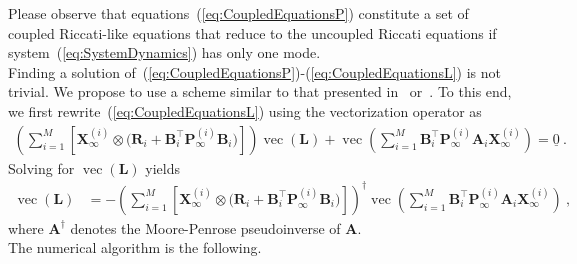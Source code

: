 \documentclass[preprint,1p,11pt]{IR-Template/ISAS_IR}
\newcommand{\nvec}[1]{\ensuremath{{{\underline{#1}}}}}
\newcommand{\mat}[1]{{\ensuremath{{\mathbf{#1}}}}}
\newcommand{\pinv}{^\dagger}
\newcommand{\tr}{^{\top}}
\DeclareMathOperator{\vvec}{vec}
\renewcommand{\vec}[1]{\vvec\klammer{#1}}
\newcommand{\klammer}[1]{\left( #1 \right)}
\newcommand{\bklammer}[1]{\left[ #1 \right]}
\newcommand{\kron}[2]{{#1 \otimes #2}}
\newcommand{\Asys}[1]{\mat{A}_{#1}}
\newcommand{\Bsys}[1]{\mat{B}_{#1}}
\newcommand{\Rsys}[1]{\mat{R}_{#1}}
\newcommand{\Xsysest}[2]{\mat{X}^{(#1)}_{#2}}
\newcommand{\ControlLaw}{\mat{L}}
\newcommand{\NumModes}{M}
\newcommand{\Pest}[2]{\mat{P}^{(#1)}_{#2}}
\begin{document}
Please observe that equations~(\ref{eq:CoupledEquationsP}) constitute a set of coupled Riccati-like equations that reduce to the uncoupled Riccati equations if system~(\ref{eq:SystemDynamics}) has only one mode.\\

Finding a solution of~(\ref{eq:CoupledEquationsP})-(\ref{eq:CoupledEquationsL}) is not trivial. We propose to use a scheme similar to that presented in~\cite{DeKoning_1992} or~\cite{Bernstein_1987}. To this end, we first rewrite~(\ref{eq:CoupledEquationsL}) using the vectorization operator as
\begin{align*}
\klammer{\sum\limits_{i=1}^{\NumModes}\bklammer{\kron{\Xsysest{i}{\infty}}{(\Rsys{i}+\Bsys{i}\tr\Pest{i}{\infty}\Bsys{i}})}} \vec{\ControlLaw} + \vec{\sum\limits_{i=1}^{\NumModes} \Bsys{i}\tr\Pest{i}{\infty}\Asys{i}\Xsysest{i}{\infty}} = \nvec{0}\ .
\end{align*}
Solving for $\vec{\ControlLaw}$ yields
\begin{align*}
\vec{\ControlLaw}
	&=
	-\klammer{\sum\limits_{i=1}^{\NumModes}\bklammer{\kron{\Xsysest{i}{\infty}}{(\Rsys{i}+\Bsys{i}\tr\Pest{i}{\infty}\Bsys{i}})}}\pinv \vec{\sum\limits_{i=1}^{\NumModes} \Bsys{i}\tr\Pest{i}{\infty}\Asys{i}\Xsysest{i}{\infty}}\ ,
\end{align*}
where $\mat{A}\pinv$ denotes the Moore-Penrose pseudoinverse of $\mat{A}$.\\

The numerical algorithm is the following.\\
\end{document}
